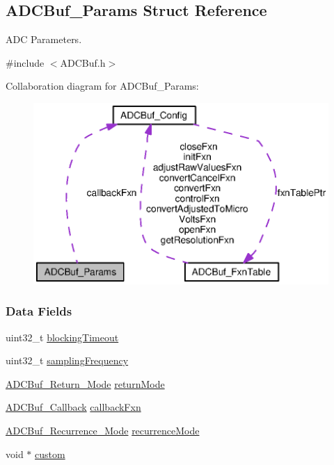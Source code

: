 \subsection{A\+D\+C\+Buf\+\_\+\+Params Struct Reference}
\label{struct_a_d_c_buf___params}


A\+D\+C Parameters.  




{\ttfamily \#include $<$A\+D\+C\+Buf.\+h$>$}



Collaboration diagram for A\+D\+C\+Buf\+\_\+\+Params\+:
\nopagebreak
\begin{figure}[H]
\begin{center}
\leavevmode
\includegraphics[width=344pt]{struct_a_d_c_buf___params__coll__graph}
\end{center}
\end{figure}
\subsubsection*{Data Fields}
\begin{DoxyCompactItemize}
\item 
uint32\+\_\+t \hyperlink{struct_a_d_c_buf___params_a3c3b5dab517e5d6bdc6dd68bda1e88d2}{blocking\+Timeout}
\item 
uint32\+\_\+t \hyperlink{struct_a_d_c_buf___params_ad2ca9d85a9379652a86ea9235e4bec82}{sampling\+Frequency}
\item 
\hyperlink{_a_d_c_buf_8h_a3d643e8024503c5ef2679c83419ba6ee}{A\+D\+C\+Buf\+\_\+\+Return\+\_\+\+Mode} \hyperlink{struct_a_d_c_buf___params_a17b3cdab5de5cfb81854b86f0cfc0ec1}{return\+Mode}
\item 
\hyperlink{_a_d_c_buf_8h_a477c377c65f8de04aa67ff7eefa0a4cf}{A\+D\+C\+Buf\+\_\+\+Callback} \hyperlink{struct_a_d_c_buf___params_a29f674ee9b6739607119d6b50f244e17}{callback\+Fxn}
\item 
\hyperlink{_a_d_c_buf_8h_af15cc4961b02af48216132c2b8bc88f1}{A\+D\+C\+Buf\+\_\+\+Recurrence\+\_\+\+Mode} \hyperlink{struct_a_d_c_buf___params_a559d4f3324bdbee8f6b6140a6d7264fb}{recurrence\+Mode}
\item 
void $\ast$ \hyperlink{struct_a_d_c_buf___params_a72c7ec51318ec2f8fcf5d2ff37de33e3}{custom}
\end{DoxyCompactItemize}


